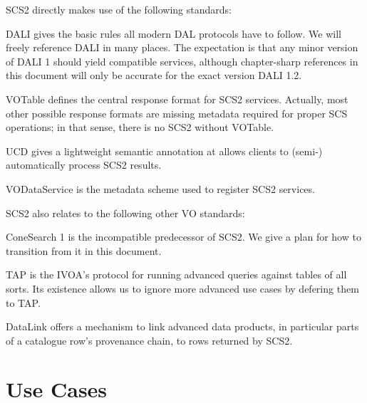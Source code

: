 \documentclass[11pt,a4paper]{ivoa}
\begin{document}
SCS2 directly makes use of the following standards:

\begin{bigdescription}
\item[DALI] \citet{2017ivoa.spec.0517D} gives the basic rules all modern
DAL protocols have to follow.  We will freely reference DALI in many
places.  The expectation is that any minor version of DALI 1 should yield
compatible services, although chapter-sharp references in this document
will only be accurate for the exact version DALI 1.2.

\item[VOTable] \citet{2025ivoa.spec.0116O} defines the central response
format for SCS2 services.  Actually, most other possible response
formats are missing metadata required for proper SCS operations; in that
sense, there is no SCS2 without VOTable.

\item[UCD] \citet{2005ivoa.spec.0819D} gives a lightweight semantic
annotation at allows clients to (semi-) automatically process SCS2
results.
 
\item[VODataService] \citet{2021ivoa.spec.1102D} is the metadata scheme
used to register SCS2 services.

\end{bigdescription}

SCS2 also relates to the following other VO standards:

\begin{bigdescription}
 \item[ConeSearch 1] \citet{2008ivoa.specQ0222P} is the incompatible
predecessor of SCS2.  We give a plan for how to transition from it in
this document.

\item[TAP] \citet{2019ivoa.spec.0927D} is the IVOA's protocol for
running advanced queries against tables of all sorts.  Its existence
allows us to ignore more advanced use cases by defering them to TAP.

\item[DataLink] \citet{2023ivoa.spec.1215B} offers a mechanism to link
advanced data products, in particular parts of a catalogue row's
provenance chain, to rows returned by SCS2.
\end{bigdescription}

\section{Use Cases}
\end{document}
